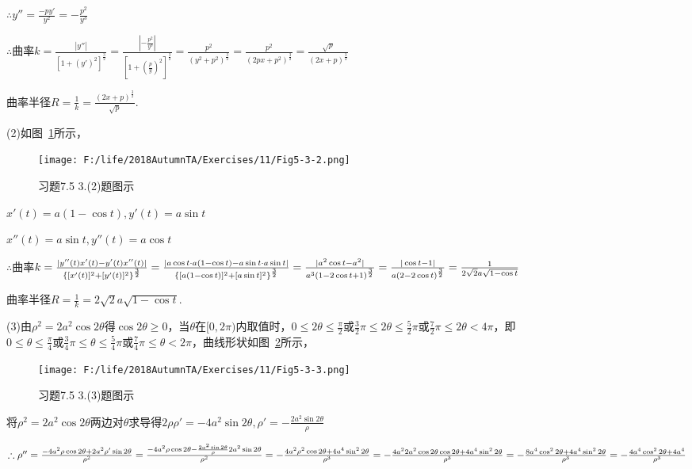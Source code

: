 \documentclass[12pt,UTF8]{ctexart}
\begin{document}
\begin{enumerate}
$\therefore y''=\frac{-py'}{y^2}=-\frac{p^2}{y^3}$

$\therefore$曲率$k=\frac{|y''|}{[1+(y')^2]^{\frac32}}=\frac{|-\frac{p^2}{y^3}|}{[1+(\frac{p}y)^2]^{\frac32}}=\frac{p^2}{(y^2+p^2)^{\frac32}}=\frac{p^2}{(2px+p^2)^{\frac32}}=\frac{\sqrt p}{(2x+p)^{\frac32}}$

曲率半径$R=\frac1k=\frac{(2x+p)^{\frac32}}{\sqrt p}$.

(2)如图~\ref{5-3-2}所示，
\begin{figure}[H]
\begin{center}
\texttt{[image: F:/life/2018AutumnTA/Exercises/11/Fig5-3-2.png]}
\end{center}
\caption{习题7.5 3.(2)题图示}
\label{5-3-2}
\end{figure}
$x'(t)=a(1-\cos t),y'(t)=a\sin t$

$x''(t)=a\sin t,y''(t)=a\cos t$

$\therefore$曲率$k=\frac{|y''(t)x'(t)-y'(t)x''(t)|}{\{[x'(t)]^2+[y'(t)]^2\}^{\frac32}}=\frac{|a\cos t\cdot a(1-\cos t)-a\sin t\cdot a\sin t|}{\{[a(1-\cos t)]^2+[a\sin t]^2\}^{\frac32}}=\frac{|a^2\cos t-a^2|}{a^3(1-2\cos t+1)^{\frac32}}=\frac{|\cos t-1|}{a(2-2\cos t)^{\frac32}}\\
=\frac1{2\sqrt2a\sqrt{1-\cos t}}$

曲率半径$R=\frac1k=2\sqrt2a\sqrt{1-\cos t}$.

(3)由$\rho^2=2a^2\cos2\theta$得$\cos2\theta\geq0$，当$\theta$在$[0,2\pi)$内取值时，$0\leq2\theta\leq\frac\pi2\text{或}\frac32\pi\leq2\theta\leq\frac52\pi\text{或}\frac72\pi\leq2\theta<4\pi$，即$0\leq\theta\leq\frac\pi4\text{或}\frac34\pi\leq\theta\leq\frac54\pi\text{或}\frac74\pi\leq\theta<2\pi$，曲线形状如图~\ref{5-3-3}所示，
\begin{figure}[H]
\begin{center}
\texttt{[image: F:/life/2018AutumnTA/Exercises/11/Fig5-3-3.png]}
\end{center}
\caption{习题7.5 3.(3)题图示}
\label{5-3-3}
\end{figure}
将$\rho^2=2a^2\cos2\theta$两边对$\theta$求导得$2\rho\rho'=-4a^2\sin2\theta,\rho'=-\frac{2a^2\sin2\theta}\rho$

$\therefore\rho''=\frac{-4a^2\rho\cos2\theta+2a^2\rho'\sin2\theta}{\rho^2}=\frac{-4a^2\rho\cos2\theta-\frac{2a^2\sin2\theta}\rho2a^2\sin2\theta}{\rho^2}=-\frac{4a^2\rho^2\cos2\theta+4a^4\sin^22\theta}{\rho^3}\\
=-\frac{4a^22a^2\cos2\theta\cos2\theta+4a^4\sin^22\theta}{\rho^3}=-\frac{8a^4\cos^22\theta+4a^4\sin^22\theta}{\rho^3}=-\frac{4a^4\cos^22\theta+4a^4}{\rho^3}$


\end{enumerate}
\end{document}
